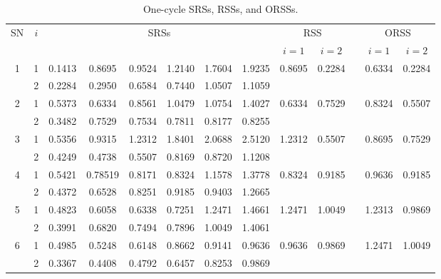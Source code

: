 \documentclass[twoside]{article}
\begin{document}
\begin{table}[h]
\begin{center}
\small
\caption{One-cycle SRSs, RSSs, and ORSSs.}\label{tab1}
\begin{tabular}{ccccccccccccc}
  \hline
 SN  & $i$ & \multicolumn{6}{c}{SRSs} & \multicolumn{2}{c}{RSS} & & \multicolumn{2}{c}{ORSS} 
 \\
\cline{9-10} \cline{12-13}
 & & & & & & & & $i=1$ & $i=2$ && $i=1$ & $i=2$
\\
 \hline
1 & 1 &  {\color{red}0.1413} & 0.8695 & 0.9524 & 1.2140 & 1.7604 & 1.9235 & 0.8695 & 0.2284 && 0.6334 & 0.2284
\\
 & 2 & {\color{red}0.2284} & 0.2950 & 0.6584 & 0.7440 & 1.0507 &  1.1059 & & &&  &  
\\
 \hline
 2 & 1 & 0.5373 & {\color{red}0.6334} & 0.8561 & 1.0479 & 1.0754 & 1.4027 & 0.6334 & 0.7529 && 0.8324 & 0.5507
\\
 & 2 &  0.3482 & {\color{red}0.7529} & 0.7534 & 0.7811 & 0.8177 & 0.8255 & & &  &  &
 \\
 \hline
 3 & 1 &  0.5356 & 0.9315 & {\color{red}1.2312} & 1.8401 & 2.0688 & 2.5120 & 1.2312 & 0.5507 & & 0.8695 & 0.7529
\\
 & 2 &  0.4249 & 0.4738 & {\color{red}0.5507} & 0.8169 & 0.8720 & 1.1208 &  &  &  &  &
 \\
 \hline
 4 & 1 & 0.5421 & 0.78519 & 0.8171 & {\color{red}0.8324} & 1.1578 & 1.3778 & 0.8324 & 0.9185 && 0.9636 & 0.9185
\\
 & 2 & 0.4372 & 0.6528 & 0.8251 & {\color{red}0.9185} & 0.9403 & 1.2665 & & &  &  &
 \\
 \hline
 5 & 1 &  0.4823 & 0.6058 & 0.6338 & 0.7251 & {\color{red}1.2471} & 1.4661 & 1.2471 & 1.0049 && 1.2313 & 0.9869
\\
 & 2 & 0.3991 & 0.6820 & 0.7494 & 0.7896 & {\color{red}1.0049} & 1.4061 & & &  & &
 \\
 \hline
 6 & 1 & 0.4985 & 0.5248 & 0.6148 & 0.8662 & 0.9141 & {\color{red}0.9636} & 0.9636 & 0.9869 & & 1.2471 & 1.0049
\\
 & 2 & 0.3367 & 0.4408 & 0.4792 & 0.6457 & 0.8253 & {\color{red}0.9869} & & &  & &
\\
 \hline
\end{tabular}
\end{center}
\end{table}
\end{document}
